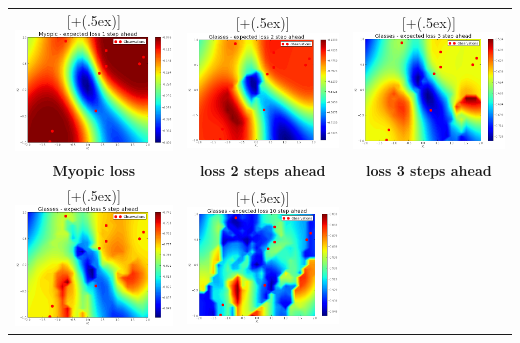\documentclass[twoside]{article}
\newcommand*{\addheight}[2][.5ex]{%
  \raisebox{0pt}[\dimexpr\height+(#1)\relax]{#2}%
}
\begin{document}
\begin{table}[t!]
\begin{tabular}{ccc}
      \addheight{\includegraphics[width=54mm]{bo_1step.png}} &
      \addheight{\includegraphics[width=54mm]{bo_2steps.png}}  &
      \addheight{\includegraphics[width=54mm]{bo_3steps.png}}\\
      \small \textbf{Myopic loss} &  \small \textbf{loss 2 steps ahead} & \small \textbf{loss 3 steps ahead} \\
      \addheight{\includegraphics[width=54mm]{bo_5steps.png}} &
      \addheight{\includegraphics[width=54mm]{bo_10steps.png}}  &

\end{tabular}
\end{table}
\end{document}
